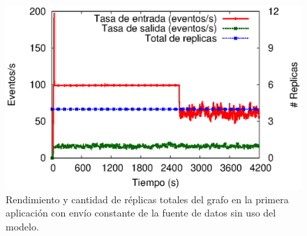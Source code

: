 \begin{figure}[!ht]
	\centering
	\includegraphics[scale=0.65]{images/exp/app1/uniform/sm/processSystem.eps}
    \caption{Rendimiento y cantidad de réplicas totales del grafo en la primera aplicación con envío constante de la fuente de datos sin uso del modelo.}
	\label{fig:app1-uniform-processSystem-sm}
\end{figure}



%
%


